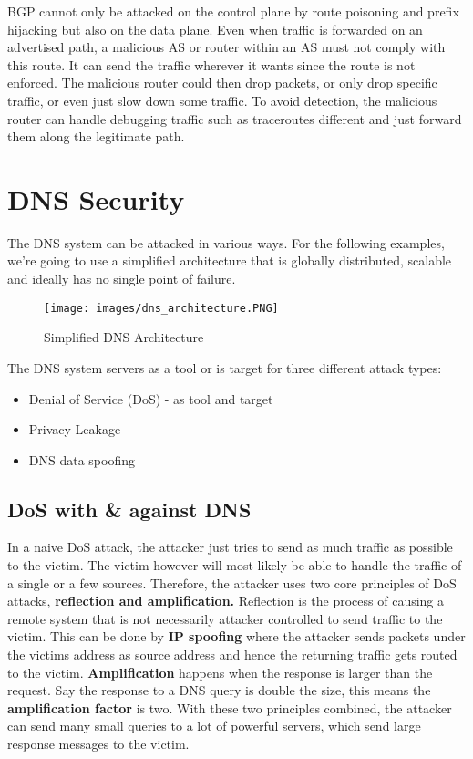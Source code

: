 BGP cannot only be attacked on the control plane by route poisoning and prefix hijacking but also on the data plane. Even when traffic is forwarded on an advertised path, a malicious AS or router within an AS must not comply with this route. It can send the traffic wherever it wants since the route is not enforced. The malicious router could then drop packets, or only drop specific traffic, or even just slow down some traffic. To avoid detection, the malicious router can handle debugging traffic such as traceroutes different and just forward them along the legitimate path.


\section{DNS Security}
The DNS system can be attacked in various ways. For the following examples, we're going to use a simplified architecture that is globally distributed, scalable and ideally has no single point of failure.
\begin{figure}[H]
\centering
\texttt{[image: images/dns\_architecture.PNG]}
\label{dns_architecture}
\caption{Simplified DNS Architecture}
\end{figure}
The DNS system servers as a tool or is target for three different attack types:
\begin{itemize}
\item Denial of Service (DoS) - as tool and target
\item Privacy Leakage
\item DNS data spoofing
\end{itemize}

\subsection{DoS with \& against DNS}
In a naive DoS attack, the attacker just tries to send as much traffic as possible to the victim. The victim however will most likely be able to handle the traffic of a single or a few sources. Therefore, the attacker uses two core principles of DoS attacks, \textbf{reflection and amplification.} Reflection is the process of causing a remote system that is not necessarily attacker controlled to send traffic to the victim. This can be done by \textbf{IP spoofing} where the attacker sends packets under the victims address as source address and hence the returning traffic gets routed to the victim. \textbf{Amplification} happens when the response is larger than the request. Say the response to a DNS query is double the size, this means the \textbf{amplification factor} is two. With these two principles combined, the attacker can send many small queries to a lot of powerful servers, which send large response messages to the victim.

